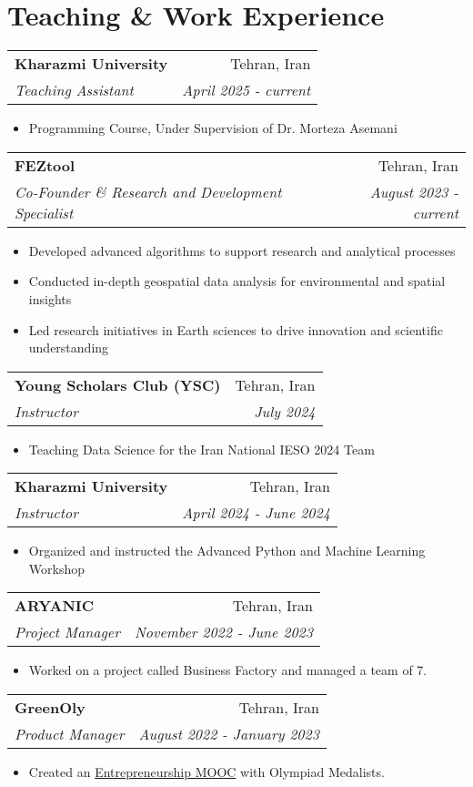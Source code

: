 \documentclass[letterpaper,11pt]{article}
\makeatletter
\newcommand{\resitem}[1]{\item #1 \vspace{-2pt}}
\newcommand{\ressubheading}[4]{
	\begin{tabular*}{6.5in}{l@{\cftdotfill{\cftsecdotsep}\extracolsep{\fill}}r}
		\textbf{#1} & #2 \\
		\textit{#3} & \textit{#4} \\
	\end{tabular*}\vspace{-8pt}
}
\makeatother
\begin{document}
	\section{Teaching \& Work Experience}
	\ressubheading{Kharazmi University}{Tehran, Iran}{Teaching Assistant}{April 2025 - current}
	\begin{itemize}[topsep=7.5pt,partopsep=0pt,itemsep=3.5pt,parsep=0pt]
		\resitem{Programming Course, Under Supervision of Dr. Morteza Asemani}
	\end{itemize}
	\ressubheading{FEZtool}{Tehran, Iran}{Co-Founder \& Research and Development Specialist}{August 2023 - current}
\begin{itemize}[topsep=7.5pt,partopsep=0pt,itemsep=3.5pt,parsep=0pt]
	\resitem{Developed advanced algorithms to support research and analytical processes}
	\resitem{Conducted in-depth geospatial data analysis for environmental and spatial insights}
	\resitem{Led research initiatives in Earth sciences to drive innovation and scientific understanding}
\end{itemize}
	\ressubheading{Young Scholars Club (YSC)}{Tehran, Iran}{Instructor}{July 2024}
\begin{itemize}[topsep=7.5pt,partopsep=0pt,itemsep=3.5pt,parsep=0pt]
	\resitem{Teaching Data Science for the Iran National IESO 2024 Team}
\end{itemize}
	\ressubheading{Kharazmi University}{Tehran, Iran}{Instructor}{April 2024 - June 2024}
\begin{itemize}[topsep=7.5pt,partopsep=0pt,itemsep=3.5pt,parsep=0pt]
	\resitem{Organized and instructed the Advanced Python and Machine Learning Workshop}
\end{itemize}
	\ressubheading{ARYANIC}{Tehran, Iran}{Project Manager}{November 2022 - June 2023}
\begin{itemize}[topsep=7.5pt,partopsep=0pt,itemsep=3.5pt,parsep=0pt]
	\resitem{Worked on a project called Business Factory and managed a team of 7.}
\end{itemize}

	\ressubheading{GreenOly}{Tehran, Iran}{Product Manager}{August 2022 - January 2023}
\begin{itemize}[topsep=7.5pt,partopsep=0pt,itemsep=3.5pt,parsep=0pt]
	\resitem{Created an \href{https://aradfarahani.com/MOOC/}{Entrepreneurship MOOC} with Olympiad Medalists.}
\end{itemize}
\end{document}
